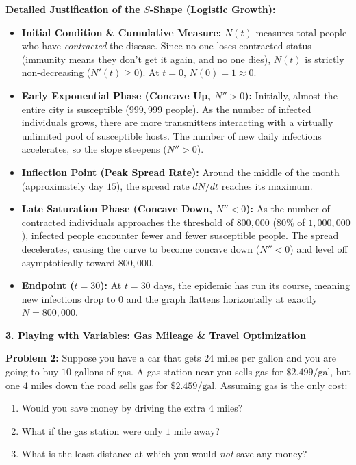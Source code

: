 \documentclass[10.5pt]{article}
\begin{document}
\vspace{-0.05in}
\textbf{Detailed Justification of the $S$-Shape (Logistic Growth):}
\begin{itemize}[leftmargin=1.2em, topsep=1pt, itemsep=2pt]
  \item \textbf{Initial Condition \& Cumulative Measure:} $N(t)$ measures total people who have \emph{contracted} the disease. Since no one loses contracted status (immunity means they don't get it again, and no one dies), $N(t)$ is strictly non-decreasing ($N'(t) \ge 0$). At $t = 0$, $N(0) = 1 \approx 0$.
  \item \textbf{Early Exponential Phase (Concave Up, $N'' > 0$):} Initially, almost the entire city is susceptible ($999,999$ people). As the number of infected individuals grows, there are more transmitters interacting with a virtually unlimited pool of susceptible hosts. The number of new daily infections accelerates, so the slope steepens ($N'' > 0$).
  \item \textbf{Inflection Point (Peak Spread Rate):} Around the middle of the month (approximately day $15$), the spread rate $dN/dt$ reaches its maximum.
  \item \textbf{Late Saturation Phase (Concave Down, $N'' < 0$):} As the number of contracted individuals approaches the threshold of $800,000$ ($80\%$ of $1,000,000$), infected people encounter fewer and fewer susceptible people. The spread decelerates, causing the curve to become concave down ($N'' < 0$) and level off asymptotically toward $800,000$.
  \item \textbf{Endpoint ($t = 30$):} At $t = 30$ days, the epidemic has run its course, meaning new infections drop to $0$ and the graph flattens horizontally at exactly $N = 800,000$.
\end{itemize}

\vspace{0.08in}

\textbf{\large 3. Playing with Variables: Gas Mileage \& Travel Optimization}

\begin{tcolorbox}[colback=boxbg, colframe=boxframe, boxrule=0.8pt, arc=3pt, left=8pt, right=8pt, top=4pt, bottom=4pt]
\textbf{Problem 2:} Suppose you have a car that gets $24$ miles per gallon and you are going to buy $10$ gallons of gas. A gas station near you sells gas for $\$2.499/\text{gal}$, but one $4$ miles down the road sells gas for $\$2.459/\text{gal}$. Assuming gas is the only cost:
\begin{enumerate}[label=(\alph*), topsep=1pt, itemsep=1pt]
  \item Would you save money by driving the extra $4$ miles?
  \item What if the gas station were only $1$ mile away?
  \item What is the least distance at which you would \emph{not} save any money?
\end{enumerate}
\end{tcolorbox}
\end{document}
